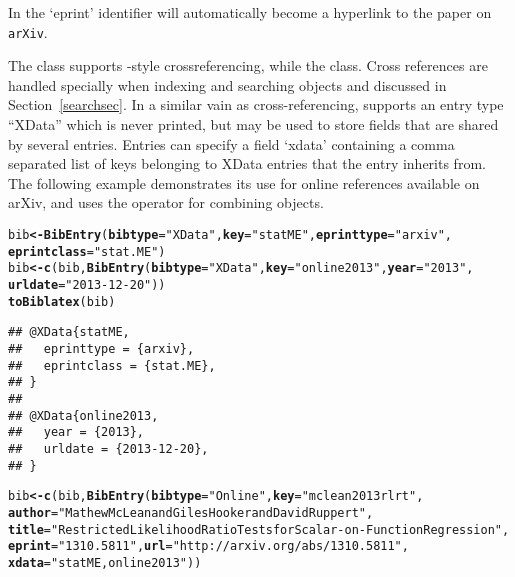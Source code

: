 \documentclass[article]{jss}\usepackage[]{graphicx}\usepackage[]{color}
\makeatletter
\newcommand{\hlstr}[1]{\textcolor[rgb]{0.125,0.125,1}{#1}}%
\newcommand{\hlstd}[1]{\textcolor[rgb]{0.251,0.251,0.282}{#1}}%
\newcommand{\hlkwb}[1]{\textcolor[rgb]{0.439,0.251,1}{\textbf{#1}}}%
\newcommand{\hlkwc}[1]{\textcolor[rgb]{0.529,0,0.184}{\textbf{#1}}}%
\newcommand{\hlkwd}[1]{\textcolor[rgb]{0.251,0.251,0.282}{\textbf{#1}}}%
\newenvironment{kframe}{%
 \def\at@end@of@kframe{}%
 \ifinner\ifhmode%
  \def\at@end@of@kframe{\end{minipage}}%
  \begin{minipage}{\columnwidth}%
 \fi\fi%
 \def\FrameCommand##1{\hskip\@totalleftmargin \hskip-\fboxsep
 \colorbox{shadecolor}{##1}\hskip-\fboxsep
     \hskip-\linewidth \hskip-\@totalleftmargin \hskip\columnwidth}%
 \MakeFramed {\advance\hsize-\width
   \@totalleftmargin\z@ \linewidth\hsize
   \@setminipage}}%
 {\par\unskip\endMakeFramed%
 \at@end@of@kframe}
\newenvironment{knitrout}{}{} %
\makeatother
\begin{document}
In \Biblatex{} the `eprint' identifier will automatically become a hyperlink to the paper on \texttt{arXiv}.  

The  class supports \Bibtex{}-style crossreferencing, while the  class.  Cross references are handled specially when indexing and searching  objects and discussed in Section~\ref{searchsec}.  In a similar vain as cross-referencing, \Biblatex{} supports an entry type ``XData'' which is never printed, but may be used to store fields that are shared by several entries.  Entries can specify a field `xdata' containing a comma separated list of keys belonging to XData entries that the entry inherits from.  The following example demonstrates its use for online references available on arXiv, and uses the  operator for combining  objects.
\begin{knitrout}
\color{fgcolor}\begin{kframe}
\begin{alltt}
\hlstd{bib} \hlkwb{<-} \hlkwd{BibEntry}\hlstd{(}\hlkwc{bibtype}\hlstd{=}\hlstr{"XData"}\hlstd{,} \hlkwc{key} \hlstd{=} \hlstr{"statME"}\hlstd{,} \hlkwc{eprinttype} \hlstd{=} \hlstr{"arxiv"}\hlstd{,}
                \hlkwc{eprintclass} \hlstd{=} \hlstr{"stat.ME"}\hlstd{)}
\hlstd{bib} \hlkwb{<-} \hlkwd{c}\hlstd{(bib,} \hlkwd{BibEntry}\hlstd{(}\hlkwc{bibtype}\hlstd{=}\hlstr{"XData"}\hlstd{,} \hlkwc{key} \hlstd{=} \hlstr{"online2013"}\hlstd{,} \hlkwc{year} \hlstd{=} \hlstr{"2013"}\hlstd{,}
                       \hlkwc{urldate} \hlstd{=} \hlstr{"2013-12-20"}\hlstd{))}
\hlkwd{toBiblatex}\hlstd{(bib)}
\end{alltt}
\begin{verbatim}
## @XData{statME,
##   eprinttype = {arxiv},
##   eprintclass = {stat.ME},
## }
## 
## @XData{online2013,
##   year = {2013},
##   urldate = {2013-12-20},
## }
\end{verbatim}
\begin{alltt}
\hlstd{bib} \hlkwb{<-} \hlkwd{c}\hlstd{(bib,} \hlkwd{BibEntry}\hlstd{(}\hlkwc{bibtype}\hlstd{=}\hlstr{"Online"}\hlstd{,} \hlkwc{key}\hlstd{=}\hlstr{"mclean2013rlrt"}\hlstd{,}
  \hlkwc{author} \hlstd{=} \hlstr{"Mathew McLean and Giles Hooker and David Ruppert"}\hlstd{,}
  \hlkwc{title} \hlstd{=} \hlstr{"Restricted Likelihood Ratio Tests for Scalar-on-Function Regression"}\hlstd{,}
  \hlkwc{eprint} \hlstd{=} \hlstr{"1310.5811"}\hlstd{,} \hlkwc{url} \hlstd{=} \hlstr{"http://arxiv.org/abs/1310.5811"}\hlstd{,}
  \hlkwc{xdata} \hlstd{=} \hlstr{"statME,online2013"}\hlstd{))}

\end{alltt}
\end{kframe}
\end{knitrout}
\end{document}
